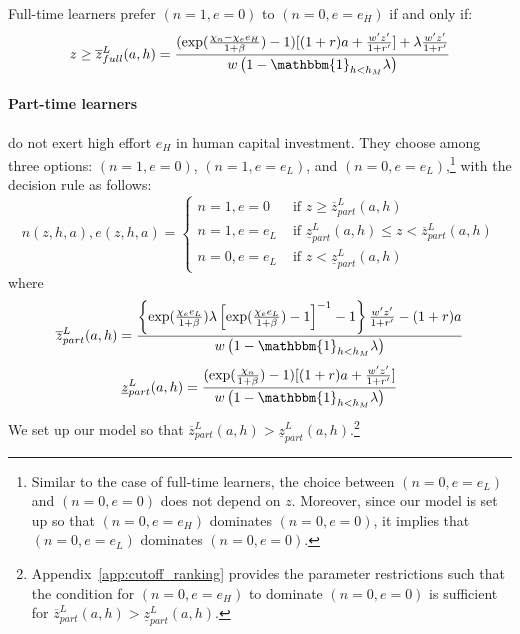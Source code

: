 \documentclass[12pt]{article}
\begin{document}
Full-time learners prefer $(n=1,e=0)$ to $(n=0,e=e_H)$ if and only if:
\begin{align} 
    z \geq \overline{z}^L_{full}(a,h)=\frac{(\exp(\frac{\chi_n-\chi_e e_H}{1+\beta})-1)[(1+r)a+\frac{w'z'}{1+r'}]+\lambda\frac{w'z'}{1+r'}}{w\left(1-\mathbbm{1}_{h < h_M}\lambda\right)} \label{eq:z-slow}
\end{align}

\paragraph{Part-time learners} do not exert high effort $e_H$ in human capital investment. They choose among three options: $(n=1,e=0)$, $(n=1,e=e_L)$, and $(n=0,e=e_L)$,\footnote{Similar to the case of full-time learners, the choice between $(n=0,e=e_L)$ and $(n=0,e=0)$ does not depend on $z$. Moreover, since our model is set up so that $(n=0,e=e_H)$ dominates $(n=0,e=0)$, it implies that $(n=0,e=e_L)$ dominates $(n=0,e=0)$.} with the decision rule as follows:
\begin{equation}
n(z,h,a),e(z,h,a) =\left \{ 
\begin{array}{cl}
n=1,e=0  & \text{ if } z \geq \overline{z}^L_{part}(a,h) \\
n=1,e=e_L & \text{ if } \underline{z}^L_{part}(a,h) \leq z<\overline{z}^L_{part}(a,h) \\
n=0,e=e_L & \text{ if } z<\underline{z}^L_{part}(a,h)
\end{array}%
\right.
\end{equation}
where 
\begin{align}
\overline{z}^L_{part}(a,h)=\frac{\left\{\exp(\frac{\chi_e e_L}{1+\beta})\lambda\left[\exp(\frac{\chi_e e_L}{1+\beta})-1\right]^{-1}-1\right\}\frac{w'z'}{1+r'}-(1+r)a}{w\left(1-\mathbbm{1}_{h < h_M}\lambda\right)}  \label{eq:z-fast-upper}
\end{align}
\begin{align}
\underline{z}^L_{part}(a,h)=\frac{(\exp(\frac{\chi_n}{1+\beta})-1)[(1+r)a+\frac{w'z'}{1+r'}]}{w\left(1-\mathbbm{1}_{h < h_M}\lambda\right)} \label{eq:z-fast-lower}
\end{align}
We set up our model so that $\overline{z}^L_{part}(a,h)>\underline{z}^L_{part}(a,h)$.\footnote{Appendix~\ref{app:cutoff_ranking} provides the parameter restrictions such that the condition for $(n=0,e=e_H)$ to dominate $(n=0,e=0)$ is sufficient for $\overline{z}^L_{part}(a,h)>\underline{z}^L_{part}(a,h)$.} 
\end{document}
